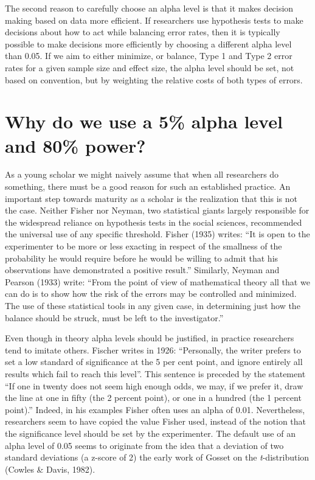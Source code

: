\documentclass[,jou,floatsintext]{apa6}
\begin{document}
The second reason to carefully choose an alpha level is that it makes decision making based on data more efficient. If researchers use hypothesis tests to make decisions about how to act while balancing error rates, then it is typically possible to make decisions more efficiently by choosing a different alpha level than 0.05. If we aim to either minimize, or balance, Type 1 and Type 2 error rates for a given sample size and effect size, the alpha level should be set, not based on convention, but by weighting the relative costs of both types of errors.

\hypertarget{why-do-we-use-a-5-alpha-level-and-80-power}{%
\section{Why do we use a 5\% alpha level and 80\% power?}\label{why-do-we-use-a-5-alpha-level-and-80-power}}

As a young scholar we might naively assume that when all researchers do something, there must be a good reason for such an established practice. An important step towards maturity as a scholar is the realization that this is not the case. Neither Fisher nor Neyman, two statistical giants largely responsible for the widespread reliance on hypothesis tests in the social sciences, recommended the universal use of any specific threshold. Fisher (1935) writes: \enquote{It is open to the experimenter to be more or less exacting in respect of the smallness of the probability he would require before he would be willing to admit that his observations have demonstrated a positive result.} Similarly, Neyman and Pearson (1933) write: \enquote{From the point of view of mathematical theory all that we can do is to show how the risk of the errors may be controlled and minimized. The use of these statistical tools in any given case, in determining just how the balance should be struck, must be left to the investigator.}

Even though in theory alpha levels should be justified, in practice researchers tend to imitate others. Fischer writes in 1926: \enquote{Personally, the writer prefers to set a low standard of significance at the 5 per cent point, and ignore entirely all results which fail to reach this level}. This sentence is preceded by the statement \enquote{If one in twenty does not seem high enough odds, we may, if we prefer it, draw the line at one in fifty (the 2 percent point), or one in a hundred (the 1 percent point).} Indeed, in his examples Fisher often uses an alpha of 0.01. Nevertheless, researchers seem to have copied the value Fisher used, instead of the notion that the significance level should be set by the experimenter. The default use of an alpha level of 0.05 seems to originate from the idea that a deviation of two standard deviations (a z-score of 2) the early work of Gosset on the \emph{t}-distribution (Cowles \& Davis, 1982).
\end{document}
